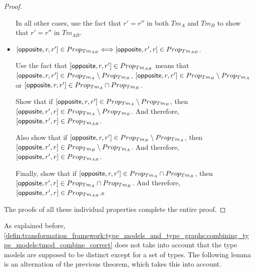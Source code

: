 \begin{proof}
\begin{itemize}
    In all other cases, use the fact that $r' = r''$ in both $Tm_{A}$ and $Tm_{B}$ to show that $r' = r''$ in $Tm_{AB}$.
    
    
    \item $[ \mathsf{opposite}, r, r' ] \in Prop_{Tm_{AB}} \Longleftrightarrow [ \mathsf{opposite}, r', r ] \in Prop_{Tm_{AB}}$.
    
    Use the fact that $[ \mathsf{opposite}, r, r' ] \in Prop_{Tm_{AB}}$ means that $[ \mathsf{opposite}, r, r' ] \in Prop_{Tm_{A}} \setminus Prop_{Tm_{B}}$, $[ \mathsf{opposite}, r, r' ] \in Prop_{Tm_{B}} \setminus Prop_{Tm_{A}}$ or $[ \mathsf{opposite}, r, r' ] \in Prop_{Tm_{A}} \cap Prop_{Tm_{B}}$.
    
    Show that if $[ \mathsf{opposite}, r, r' ] \in Prop_{Tm_{A}} \setminus Prop_{Tm_{B}}$, then $[ \mathsf{opposite}, r', r ] \in Prop_{Tm_{A}} \setminus Prop_{Tm_{B}}$. And therefore, $[ \mathsf{opposite}, r', r ] \in Prop_{Tm_{AB}}$.
    
    Also show that if $[ \mathsf{opposite}, r, r' ] \in Prop_{Tm_{B}} \setminus Prop_{Tm_{A}}$, then $[ \mathsf{opposite}, r', r ] \in Prop_{Tm_{B}} \setminus Prop_{Tm_{A}}$. And therefore, $[ \mathsf{opposite}, r', r ] \in Prop_{Tm_{AB}}$.
    
    Finally, show that if $[ \mathsf{opposite}, r, r' ] \in Prop_{Tm_{A}} \cap Prop_{Tm_{B}}$, then $[ \mathsf{opposite}, r', r ] \in Prop_{Tm_{A}} \cap Prop_{Tm_{B}}$. And therefore, $[ \mathsf{opposite}, r', r ] \in Prop_{Tm_{AB}}$.s
\end{itemize}

The proofs of all these individual properties complete the entire proof.
\end{proof}

As explained before, \cref{defin:transformation_framework:type_models_and_type_graphs:combining_type_models:tmod_combine_correct} does not take into account that the type models are supposed to be distinct except for a set of types. The following lemma is an alternation of the previous theorem, which takes this into account.

